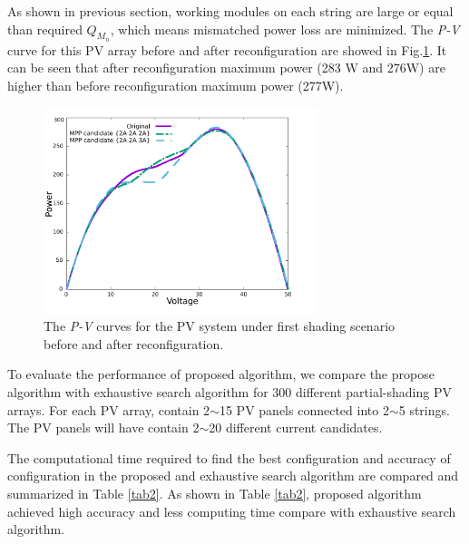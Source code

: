 \documentclass[conference]{IEEEtran}
\begin{document}
As shown in previous section, working modules on each string are large or equal than required \textit{$Q_{M_n}$}, which means mismatched power loss are minimized. The \textit{P-V} curve for this PV array before and after reconfiguration are showed in Fig.\ref{fig6}. It can be seen that after reconfiguration maximum power (283 W and 276W) are higher than before reconfiguration maximum power (277W).

\begin{figure}[htbp]
\centerline{\includegraphics[width=8cm]{zhao.pdf}}
\caption{The \textit{P-V} curves for the PV system under first shading scenario before and after reconfiguration.}
\label{fig6}
\end{figure}

To evaluate the performance of proposed algorithm, we compare the propose algorithm with exhaustive search algorithm for 300 different partial-shading PV arrays. For each PV array, contain 2$\sim$15 PV panels connected into 2$\sim$5 strings. The PV panels will have contain 2$\sim$20 different current candidates. 



The computational time required to find the best configuration and accuracy of configuration in the proposed and exhaustive search algorithm are compared and summarized in Table \ref{tab2}. As shown in Table \ref{tab2}, proposed algorithm achieved high accuracy and less computing time compare with exhaustive search algorithm.
\end{document}
